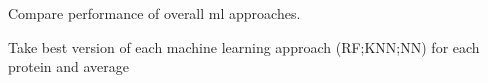 Compare performance of overall ml approaches.

Take best version of each machine learning approach (RF;KNN;NN) for each protein and average